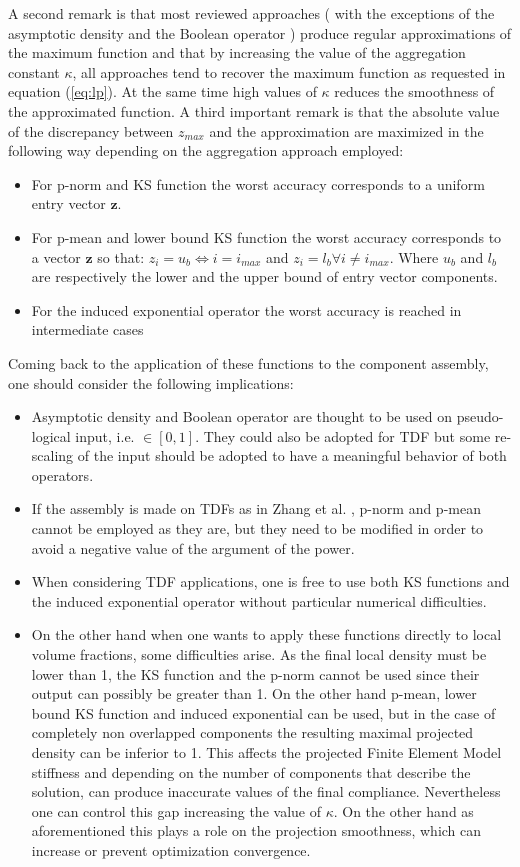 A second remark is that most reviewed approaches ( with the exceptions of the asymptotic density and the Boolean operator ) produce regular approximations of the maximum function and that by increasing the value of the aggregation constant $\kappa$, all approaches tend to recover the maximum function as requested in equation (\ref{eq:lp}). At the same time high values of $\kappa$ reduces the smoothness of the approximated function. A third important remark is that the absolute value of the discrepancy between  $z_{max}$ and the approximation are maximized in the following way depending on the aggregation approach employed:
\begin{itemize}
    \item For p-norm and KS function the worst accuracy corresponds to a uniform entry vector $\mathbf{z}$.
    \item For p-mean and lower bound KS function the worst accuracy corresponds to a vector $\mathbf{z}$ so that: $z_i=u_b \Leftrightarrow i=i_{max}$ and $z_i=l_b \forall i\neq i_{max}$. Where $u_b$ and $l_b$ are respectively the lower and the upper bound of entry vector components.
    \item For the induced exponential operator the worst accuracy is reached in intermediate cases
\end{itemize}
Coming back to the application of these functions to the component assembly, one should consider the following implications:
\begin{itemize}
\item Asymptotic density and Boolean operator are thought to be used on pseudo-logical input, i.e. $\in [0,1]$. They could also be adopted for TDF but some re-scaling of the input should be adopted to have a meaningful behavior of both operators. 
\item If the assembly is made on TDFs as in Zhang et al. \cite{zhang2016new}, p-norm and p-mean cannot be employed as they are, but they need to be modified in order to avoid a negative value of the argument of the power.
\item When considering TDF applications, one is free to use both KS functions and the induced exponential operator without particular numerical difficulties.
\item On the other hand when one wants to apply these functions directly to local volume fractions, some difficulties arise. As the final local density must be lower than 1, the KS function and the p-norm cannot be used since their output can possibly be greater than 1. On the other hand  p-mean, lower bound KS function and induced exponential can be used, but in the case of completely non overlapped components the resulting maximal projected density can be inferior to 1. This affects the projected Finite Element Model stiffness and depending on the number of components that describe the solution, can produce inaccurate values of the final compliance. Nevertheless one can control this gap increasing the value of $\kappa$. On the other hand as aforementioned this plays a role on the projection smoothness, which can increase or prevent optimization convergence.
\end{itemize}
